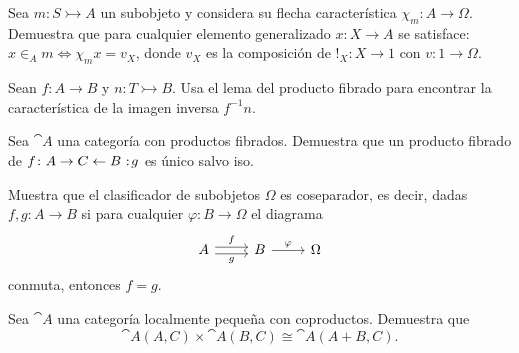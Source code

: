 \begin{exercise}[teca=1]
  Sea \(m\colon S\rightarrowtail A\) un subobjeto y considera su flecha
  característica \(\chi_m\colon A\to \Omega\). Demuestra que para
  cualquier elemento generalizado \(x\colon X\to A\) se satisface: \( x\in_A m \iff \chi_m x = v_X \), donde \(v_X\) es la composición de \(!_X\colon X\to 1\) con \(v\colon 1\to \Omega\).
\end{exercise}

\begin{exercise}
  Sean \(f\colon A\to B\) y \(n\colon T\rightarrowtail B\). Usa el lema
  del producto fibrado para encontrar la característica de la imagen
  inversa \(f^{-1}n\).
\end{exercise}


\begin{exercise}[par=2]
  Sea \(\cat{A}\) una categoría con productos fibrados. Demuestra que un
  producto fibrado de \(f\colon A\to C\leftarrow B\noloc g\) es
  único salvo iso.
\end{exercise}

\begin{exercise}[par=2, teca=2]
  Muestra que el clasificador de subobjetos \(\Omega\) es coseparador, es
  decir, dadas \(f,g\colon A\to B\) si para cualquier 
  \(\varphi\colon B\to\Omega\) el diagrama
  \begin{equation*}
    \begin{tikzcd}[ampersand replacement=\&]
      A\ar[shift left]{r}{f}\ar[shift right]{r}[swap]{g}\& B\ar{r}{\varphi}\& \Omega      
    \end{tikzcd}
  \end{equation*}
  conmuta, entonces \(f = g\).
\end{exercise}

\begin{exercise}[par=2]
  Sea \(\cat{A}\) una categoría localmente pequeña con coproductos. Demuestra que
  \begin{equation*}
    \cat{A}(A,C)\times\cat{A}(B,C)\cong\cat{A}(A+B,C).
  \end{equation*}
\end{exercise}

